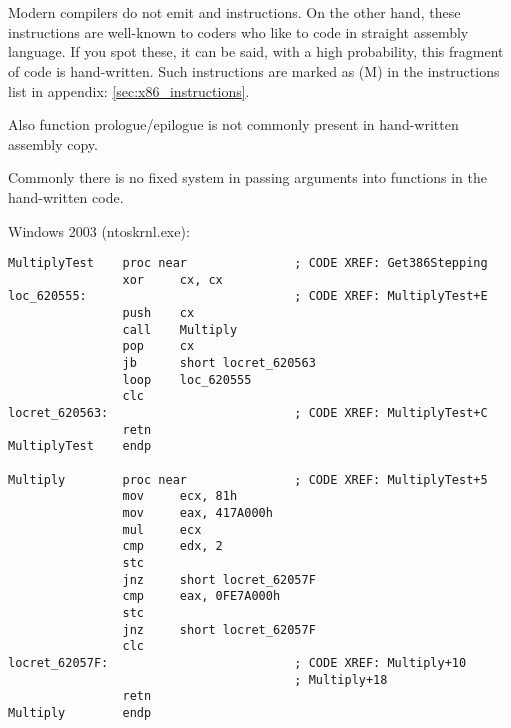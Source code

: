 \section{}

\subsection{}

{Modern compilers do not emit  and  instructions.
On the other hand, these instructions are well-known to coders who like to code in straight assembly language.
If you spot these, it can be said, with a high probability, this fragment of code is hand-written.
Such instructions are marked as (M) in the instructions list in appendix: \ref{sec:x86_instructions}.}

{Also function prologue/epilogue is not commonly present in hand-written assembly copy.}

{Commonly there is no fixed system in passing arguments into functions in the hand-written
code}.

 Windows 2003 
(ntoskrnl.exe):

\begin{lstlisting}
MultiplyTest    proc near               ; CODE XREF: Get386Stepping
                xor     cx, cx
loc_620555:                             ; CODE XREF: MultiplyTest+E
                push    cx
                call    Multiply
                pop     cx
                jb      short locret_620563
                loop    loc_620555
                clc
locret_620563:                          ; CODE XREF: MultiplyTest+C
                retn
MultiplyTest    endp

Multiply        proc near               ; CODE XREF: MultiplyTest+5
                mov     ecx, 81h
                mov     eax, 417A000h
                mul     ecx
                cmp     edx, 2
                stc
                jnz     short locret_62057F
                cmp     eax, 0FE7A000h
                stc
                jnz     short locret_62057F
                clc
locret_62057F:                          ; CODE XREF: Multiply+10
                                        ; Multiply+18
                retn
Multiply        endp
\end{lstlisting}

